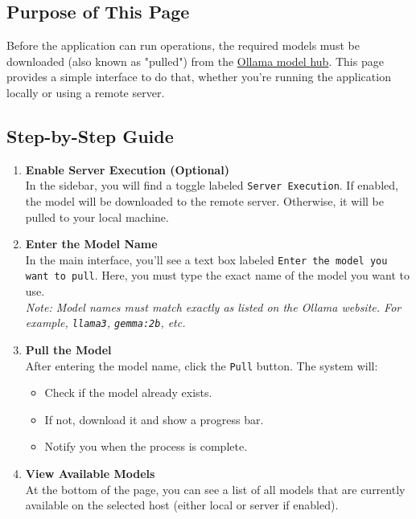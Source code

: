 \documentclass[11pt,a4paper]{report}
\begin{document}
\subsection*{Purpose of This Page}

Before the application can run operations, the required models must be downloaded (also known as "pulled") from the \href{https://ollama.com/library}{Ollama model hub}. This page provides a simple interface to do that, whether you're running the application locally or using a remote server.

\subsection*{Step-by-Step Guide}

\begin{enumerate}
    \item \textbf{Enable Server Execution (Optional)} \\
    In the sidebar, you will find a toggle labeled \texttt{Server Execution}. If enabled, the model will be downloaded to the remote server. Otherwise, it will be pulled to your local machine. \\

    \item \textbf{Enter the Model Name} \\
    In the main interface, you’ll see a text box labeled \texttt{Enter the model you want to pull}. Here, you must type the exact name of the model you want to use. \\
    \textit{Note: Model names must match exactly as listed on the Ollama website. For example, \texttt{llama3}, \texttt{gemma:2b}, etc.}

    \item \textbf{Pull the Model} \\
    After entering the model name, click the \texttt{Pull} button. The system will:
    \begin{itemize}
        \item Check if the model already exists.
        \item If not, download it and show a progress bar.
        \item Notify you when the process is complete.
    \end{itemize}

    \item \textbf{View Available Models} \\
    At the bottom of the page, you can see a list of all models that are currently available on the selected host (either local or server if enabled).
\end{enumerate}
\newpage
\end{document}
